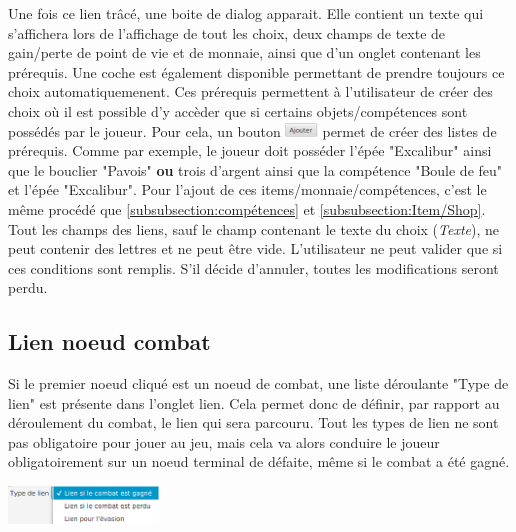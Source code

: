 		Une fois ce lien trâcé, une boite de dialog apparait. Elle contient un texte qui s'affichera lors de l'affichage de tout les choix, deux champs de texte de gain/perte de point de vie et de monnaie, ainsi que d'un onglet contenant les prérequis. Une coche est également disponible permettant de prendre toujours ce choix automatiquemenent.
		Ces prérequis permettent à l'utilisateur de créer des choix où il est possible d'y accèder que si certains objets/compétences sont possédés par le joueur.
		Pour cela, un bouton \includegraphics[height=10pt]{img/ajouterBouton.png} permet de créer des listes de prérequis. Comme par exemple, le joueur doit posséder l'épée "Excalibur" ainsi que le bouclier "Pavois" \textbf{ou} trois d'argent ainsi que la compétence "Boule de feu" et l'épée "Excalibur".
		Pour l'ajout de ces items/monnaie/compétences, c'est le même procédé que \ref{subsubsection:compétences} et \ref{subsubsection:Item/Shop}.\\

		Tout les champs des liens, sauf le champ contenant le texte du choix (\textit{Texte}), ne peut contenir des lettres et ne peut être vide. L'utilisateur ne peut valider que si ces conditions sont remplis. S'il décide d'annuler, toutes les modifications seront perdu.\\

		\subsection{Lien noeud combat}\label{subsection:lienCombat}
			\begin{minipage}{0.70\textwidth}
				Si le premier noeud cliqué est un noeud de combat, une liste déroulante "Type de lien" est présente dans l'onglet lien. Cela permet donc de définir, par rapport au déroulement du combat, le lien qui sera parcouru. Tout les types de lien ne sont pas obligatoire pour jouer au jeu, mais cela va alors conduire le joueur obligatoirement sur un noeud terminal de défaite, même si le combat a été gagné.
			\end{minipage}
			\hfill
			\begin{minipage}{4cm}
				\includegraphics[width=4cm]{img/lienCombat.png}
			\end{minipage}

